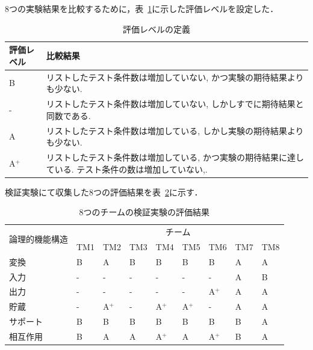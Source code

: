 8つの実験結果を比較するために，表~\ref{tbl:D-3-tbl4}に示した評価レベルを設定した．

\begin{table}[htbp]
\footnotesize
  \centering
  \caption{評価レベルの定義}
    \begin{tabular}{|l|p{14em}|}
       \hline
    評価レベル & \multicolumn{1}{l|}{比較結果} \\
        \hline
     B    & リストしたテスト条件数は増加していない, かつ実験の期待結果よりも少ない.  \\
        \hline
    -     & リストしたテスト条件数は増加していない, しかしすでに期待結果と同数である.  \\
        \hline
    A     & リストしたテスト条件数は増加している, しかし実験の期待結果よりも少ない.   \\
       \hline
    A${}^\text{+}$    & リストしたテスト条件数は増加している, かつ実験の期待結果に達している. テスト条件の数は増加していない,.  \\
        \hline
    \end{tabular}%
  \label{tbl:D-3-tbl4}%
\end{table}%

検証実験にて収集した8つの評価結果を表~\ref{tbl:D-3-tbl5}に示す．

\begin{table}[htbp]
\footnotesize
  \centering
  \caption{8つのチームの検証実験の評価結果}
    \begin{tabular}{|l|l|l|l|l|l|l|l|l|}
    \hline
    \multicolumn{1}{|c|}{\multirow{2}[4]{*}{論理的機能構造}} & \multicolumn{8}{c|}{チーム} \bigstrut\\
\cline{2-9}          & TM1   & TM2   & TM3   & TM4   & TM5   & TM6 & TM7 & TM8 \bigstrut\\
    \hline
    変換  & B     & A     & B     & B     & B     & B & A     & A\bigstrut\\
    \hline
    入力 &  -     &   -     &   -    &   -    &   -    & -     & A     & B   \bigstrut\\
    \hline
    出力 & -     & -     & -     & -     & -     & A${}^\text{+}$ & A     & A \bigstrut\\
    \hline
    貯蔵 & -     & A${}^\text{+}$    & -     & A${}^\text{+}$    & A${}^\text{+}$    & -& A     & A  \bigstrut\\
    \hline
    サポート & B     & B     & B     & B     & B     & B& B     & A \bigstrut[t]\\
    \hline
    相互作用  & B     & A     & A     & A${}^\text{+}$    & A     & A${}^\text{+}$& B     & A \bigstrut[b]\\
    \hline
    \end{tabular}%
  \label{tbl:D-3-tbl5}%
\end{table}%

